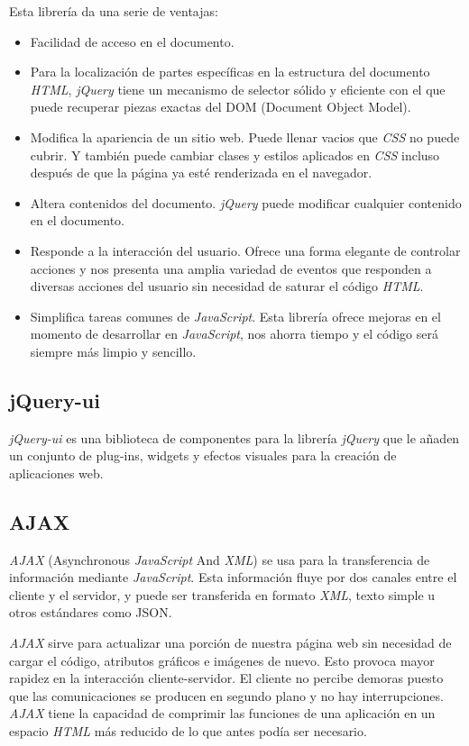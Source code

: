 \documentclass[a4paper, 12pt]{book}
\begin{document}
Esta librer\'ia da una serie de ventajas: 
\begin{itemize}
  \item Facilidad de acceso en el documento.
  \item Para la localizaci\'on de partes espec\'ificas en la estructura del documento \textit{HTML}, \textit{jQuery} tiene un mecanismo de selector s\'olido y 
eficiente con el que puede recuperar piezas exactas del DOM (Document Object Model).
  \item Modifica la apariencia de un sitio web. Puede llenar vacios que \textit{CSS} no puede cubrir. Y tambi\'en puede cambiar clases y estilos aplicados 
en \textit{CSS} incluso despu\'es de que la p\'agina ya est\'e renderizada en el navegador.
  \item Altera contenidos del documento. \textit{jQuery} puede modificar cualquier contenido en el documento.
  \item Responde a la interacci\'on del usuario. Ofrece una forma elegante de controlar acciones y nos presenta una amplia variedad de eventos 
que responden a diversas acciones del usuario sin necesidad de saturar el c\'odigo \textit{HTML}.
  \item Simplifica tareas comunes de \textit{JavaScript}. Esta librer\'ia ofrece mejoras en el momento de desarrollar en \textit{JavaScript}, nos ahorra tiempo 
y el c\'odigo ser\'a siempre m\'as limpio y sencillo.
\end{itemize}


\subsection{jQuery-ui}
\label{subsec:jqueryui}
\textit{jQuery-ui} es una biblioteca de componentes para la librer\'ia \textit{jQuery} que le a\~naden un conjunto de plug-ins, widgets y efectos visuales para la 
creaci\'on de aplicaciones web.


\subsection{AJAX}
\label{subsec:ajax}
\textit{AJAX} (Asynchronous \textit{JavaScript} And \textit{XML}) se usa para la transferencia de informaci\'on mediante \textit{JavaScript}. Esta informaci\'on fluye por dos canales 
entre el cliente y el servidor, y puede ser transferida en formato \textit{XML}, texto simple u otros est\'andares como JSON.

\textit{AJAX} sirve para actualizar una porci\'on de nuestra p\'agina web sin necesidad de cargar el c\'odigo, atributos gr\'aficos e im\'agenes de nuevo. Esto
provoca mayor rapidez en la interacci\'on cliente-servidor. El cliente no percibe demoras puesto que las comunicaciones se producen en segundo plano y
no hay interrupciones. \textit{AJAX} tiene la capacidad de comprimir las funciones de una aplicaci\'on en un espacio \textit{HTML} m\'as reducido de lo que antes pod\'ia
ser necesario.
\end{document}
